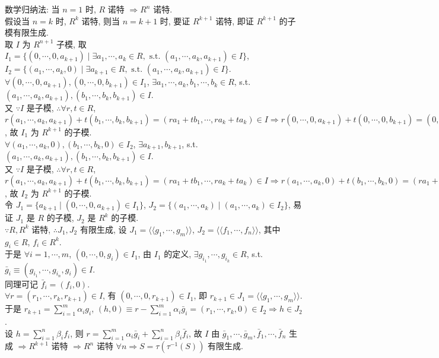 \documentclass{note}
\begin{document}
\begin{pf}
    数学归纳法: 当 $n=1$ 时, $R$ 诺特 $\Longrightarrow R^n$ 诺特.\\
    假设当 $n=k$ 时, $R^k$ 诺特, 则当 $n=k+1$ 时, 要证 $R^{k+1}$ 诺特, 即证 $R^{k+1}$ 的子模有限生成.\\
    取 $I$ 为 $R^{n+1}$ 子模, 取 $I_1=\{(0,\cdots,0,a_{k+1})\mid\exists a_1,\cdots,a_k\in R,\text{ s.t. }(a_1,\cdots,a_k,a_{k+1})\in I\}$, $I_2=\{(a_1,\cdots,a_k,0)\mid\exists a_{k+1}\in R,\text{ s.t. }(a_1,\cdots,a_k,a_{k+1})\in I\}$.\\
    $\forall(0,\cdots,0,a_{k+1}),(0,\cdots,0,b_{k+1})\in I_1$, $\exists a_1,\cdots,a_k,b_1,\cdots,b_k\in R$, s.t. $(a_1,\cdots,a_k,a_{k+1}),(b_1,\cdots,b_k,b_{k+1})\in I$.\\
    又 $\because I$ 是子模, $\therefore\forall r,t\in R$, $r(a_1,\cdots,a_k,a_{k+1})+t(b_1,\cdots,b_k,b_{k+1})=(ra_1+tb_1,\cdots,ra_k+ta_k)\in I\Longrightarrow r(0,\cdots,0,a_{k+1})+t(0,\cdots,0,b_{k+1})=(0,\cdots,0,ra_{k+1}+tb_{k+1})\in I_1$, 故 $I_1$ 为 $R^{k+1}$ 的子模.\\
    $\forall(a_1,\cdots,a_k,0),(b_1,\cdots,b_k,0)\in I_2$, $\exists a_{k+1},b_{k+1}$, s.t. $(a_1,\cdots,a_k,a_{k+1}),(b_1,\cdots,b_k,b_{k+1})\in I$.\\
    又 $\because I$ 是子模, $\therefore\forall r,t\in R$, $r(a_1,\cdots,a_k,a_{k+1})+t(b_1,\cdots,b_k,b_{k+1})=(ra_1+tb_1,\cdots,ra_k+ta_k)\in I\Longrightarrow r(a_1,\cdots,a_k,0)+t(b_1,\cdots,b_k,0)=(ra_1+tb_1,\cdots,ra_k+tb_k,0)\in I_2$, 故 $I_2$ 为 $R^{k+1}$ 的子模.\\
    令 $J_1=\{a_{k+1}\mid(0,\cdots,0,a_{k+1})\in I_1\}$, $J_2=\{(a_1,\cdots,a_k)\mid(a_1,\cdots,a_k)\in I_2\}$, 易证 $J_1$ 是 $R$ 的子模, $J_2$ 是 $R^k$ 的子模.\\
    $\because R,R^k$ 诺特, $\therefore J_1,J_2$ 有限生成, 设 $J_1=\langle\langle g_1,\cdots,g_m\rangle\rangle$, $J_2=\langle\langle f_1,\cdots,f_n\rangle\rangle$, 其中 $g_i\in R$, $f_i\in R^k$.\\
    于是 $\forall i=1,\cdots,m$, $(0,\cdots,0,g_i)\in I_1$, 由 $I_1$ 的定义, $\exists g_{i_1},\cdots,g_{i_k}\in R$, s.t. $\bar{g}_i\equiv(g_{i_1},\cdots,g_{i_n},g_i)\in I$.\\
    同理可记 $\bar{f}_i=(f_i,0)$.\\
    $\forall r=(r_1,\cdots,r_k,r_{k+1})\in I$, 有 $(0,\cdots,0,r_{k+1})\in I_1$, 即 $r_{k+1}\in J_1=\langle\langle g_1,\cdots,g_m\rangle\rangle$.\\
    于是 $r_{k+1}=\sum_{i=1}^m\alpha_ig_i$, $(h,0)\equiv r-\sum_{i=1}^m\alpha_i\bar{g}_i=(r_1,\cdots,r_k,0)\in I_2\Longrightarrow h\in J_2$.\\
    设 $h=\sum_{i=1}^n\beta_if_i$, 则 $r=\sum_{i=1}^m\alpha_i\bar{g}_i+\sum_{i=1}^n\beta_i\bar{f}_i$, 故 $I$ 由 $\bar{g}_1,\cdots,\bar{g}_m,\bar{f}_1,\cdots,\bar{f}_n$ 生成 $\Longrightarrow R^{k+1}$ 诺特 $\Longrightarrow R^n$ 诺特 $\forall n\Longrightarrow S=\tau(\tau^{-1}(S))$ 有限生成.
\end{pf}
\end{document}
